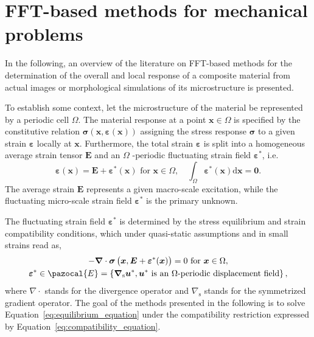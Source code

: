 \chapter{FFT-based methods for mechanical problems}

In the following, an overview of the literature on FFT-based methods for the determination of the overall and local response of a composite material from actual images or morphological simulations of its microstructure is presented.

To establish some context, let the microstructure of the material be represented by a periodic cell \(\Omega\).
The material response at a point \(\bm x \in \Omega\) is specified by the constitutive relation \(\bm \sigma(\bm x, \bm\varepsilon(\bm x))\) assigning the stress response \(\bm\sigma\) to a given strain \(\bm\varepsilon\) locally at \(\bm x\).
Furthermore, the total strain \(\bm\varepsilon\) is split into a homogeneous average strain tensor \(\boldsymbol{E}\) and an \(\Omega\) -periodic fluctuating strain field \(\bm\varepsilon^{*}\), i.e.
\begin{equation}
\bm \varepsilon(\boldsymbol{x})=\boldsymbol{E}+\bm\varepsilon^{*}(\boldsymbol{x}) \text { for } \boldsymbol{x} \in \Omega, \quad \int_{\Omega} \bm\varepsilon^{*}(\boldsymbol{x}) \mathrm{d} \boldsymbol{x}=\mathbf{0} .
\end{equation}
The average strain \(\bm E\) represents a given macro-scale excitation, while the fluctuating micro-scale strain field \(\pmb \varepsilon^{*}\) is the primary unknown.

The fluctuating strain field \(\bm \varepsilon^{*}\) is determined by the stress equilibrium and strain compatibility conditions, which under quasi-static assumptions and in small strains read as,
\begin{gather}
-\bm{\nabla} \cdot \bm\sigma\left(\bm x, \bm E+\bm\varepsilon^{*}(\bm x)\right)=0 \text { for } \bm x \in \Omega,\label{eq:equilibrium_equation}\\
\bm\varepsilon^{*} \in \pazocal{E}=\left\{\boldsymbol{\nabla}_{\mathrm{s}} \boldsymbol{u}^{*}, \text{\(\boldsymbol{u}^{*}\) is an \(\Omega\)-periodic displacement field}\right\} \label{eq:compatibility_equation},
\end{gather}
 where \(\nabla \cdot\) stands for the divergence operator and \(\nabla_{\mathrm{s}}\) stands for the symmetrized gradient operator.
 The goal of the methods presented in the following is to solve Equation~\eqref{eq:equilibrium_equation} under the compatibility restriction expressed by Equation~\eqref{eq:compatibility_equation}.

